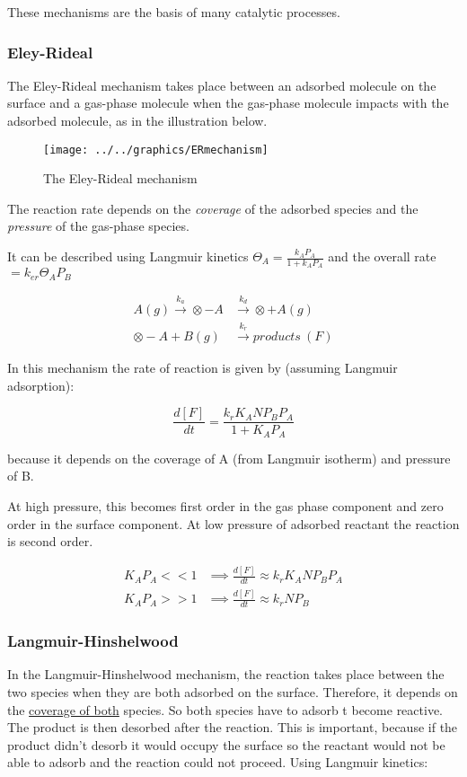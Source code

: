 \documentclass[ignorenonframetext]{beamer}
\begin{document}
These mechanisms are the basis of many catalytic processes.

\subsubsection{Eley-Rideal}

The Eley-Rideal mechanism takes place between an adsorbed molecule on the surface and a gas-phase molecule when the gas-phase molecule impacts with the adsorbed molecule, as in the illustration below.

\begin{figure}[H]
\centering
\texttt{[image: ../../graphics/ERmechanism]}
\caption{The Eley-Rideal mechanism}
\end{figure}

The reaction rate depends on the \textit{coverage} of the adsorbed species and the \textit{pressure} of the gas-phase species.

It can be described using Langmuir kinetics \(\Theta_A = \frac{k_AP_A}{1+k_AP_A}\) and the overall rate \(= k_{er}\Theta_AP_B\)

\begin{align*}
A(g) \xrightarrow{k_a} \otimes-A &\xrightarrow{k_d} \otimes + A(g)\\
\otimes-A + B(g) &\xrightarrow{k_r} products\ (F)
\end{align*}

In this mechanism the rate of reaction is given by (assuming Langmuir adsorption):

\[\frac{d[F]}{dt} = \frac{k_rK_ANP_BP_A}{1+K_AP_A}\]

because it depends on the coverage of A (from Langmuir isotherm) and pressure of B.

At high pressure, this becomes first order in the gas phase component and zero order in the surface component. At low pressure of adsorbed reactant the reaction is second order.

\begin{align*}
K_AP_A << 1 &\implies \frac{d[F]}{dt} \approx k_rK_ANP_BP_A\\
K_AP_A >> 1 &\implies \frac{d[F]}{dt} \approx k_rNP_B
\end{align*}


\subsubsection{Langmuir-Hinshelwood}

In the Langmuir-Hinshelwood mechanism, the reaction takes place between the two species when they are both adsorbed on the surface. Therefore, it depends on the \underline{coverage of both} species. So both species have to adsorb t become reactive. The product is then desorbed after the reaction. This is important, because if the product didn't desorb it would occupy the surface so the reactant would not be able to adsorb and the reaction could not proceed. Using Langmuir kinetics:
\end{document}
